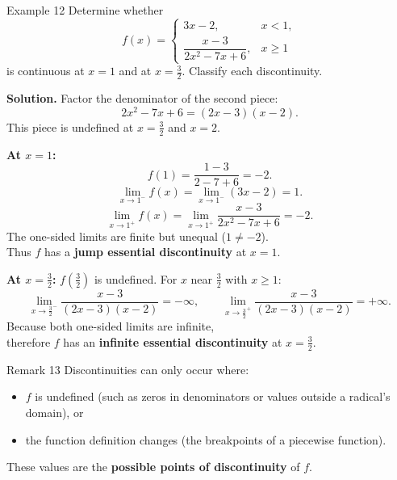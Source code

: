 \begin{examplebox}{Example 12}
Determine whether
\[
f(x) = \begin{cases}
3x - 2, & x < 1, \\[8pt]
\dfrac{x - 3}{2x^{2} - 7x + 6}, & x \ge 1
\end{cases}
\]
is continuous at \(x = 1\) and at \(x = \frac{3}{2}\). Classify each discontinuity.

\medskip
\textbf{Solution.}
Factor the denominator of the second piece:
\[
2x^{2} - 7x + 6 = (2x - 3)(x - 2).
\]
This piece is undefined at \(x = \frac{3}{2}\) and \(x = 2\).

\medskip
\noindent\textbf{At \(x = 1\):}
\[
f(1) = \frac{1 - 3}{2 - 7 + 6} = -2.
\]
\[
\lim_{x \to 1^{-}} f(x) = \lim_{x \to 1^{-}} (3x - 2) = 1.
\]
\[
\lim_{x \to 1^{+}} f(x) = \lim_{x \to 1^{+}} \frac{x - 3}{2x^{2} - 7x + 6} = -2.
\]
The one-sided limits are finite but unequal (\(1 \neq -2\)). \\ Thus \(f\) has a \textbf{jump essential discontinuity} at \(x = 1\).

\medskip
\noindent\textbf{At \(x = \frac{3}{2}\):}
\(f\!\left(\frac{3}{2}\right)\) is undefined. For \(x\) near \(\frac{3}{2}\) with \(x \ge 1\):
\[
\lim_{x \to \frac{3}{2}^{-}} \frac{x - 3}{(2x - 3)(x - 2)} = -\infty,
\qquad
\lim_{x \to \frac{3}{2}^{+}} \frac{x - 3}{(2x - 3)(x - 2)} = +\infty.
\]
Because both one-sided limits are infinite, \\
therefore \(f\) has an \textbf{infinite essential discontinuity} at \(x = \frac{3}{2}\).
\end{examplebox}

\begin{remarkbox}{Remark 13}
Discontinuities can only occur where:
\begin{itemize}
    \item \(f\) is undefined (such as zeros in denominators or values outside a radical's domain), or
    \item the function definition changes (the breakpoints of a piecewise function).
\end{itemize}
These values are the \textbf{possible points of discontinuity} of \(f\).
\end{remarkbox}

